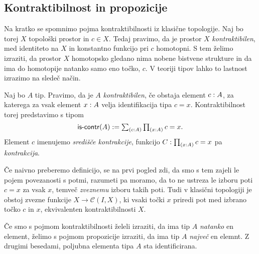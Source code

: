 \subsection{Kontraktibilnost in propozicije}
Na kratko se spomnimo pojma kontraktibilnosti iz klasične topologije. Naj bo torej \(X\) topološki prostor in \(c \in X\). Tedaj pravimo, da je prostor \(X\) \emph{kontraktibilen}, med identiteto na \(X\) in konstantno funkcijo pri \(c\) homotopni. S tem želimo izraziti, da prostor \(X\) homotopsko gledano nima nobene bistvene strukture in da ima do homotopije natanko samo eno točko, \(c\). V teoriji tipov lahko to lastnost izrazimo na sledeč način.
\begin{definicija}
  Naj bo \(A\) tip. Pravimo, da je \(A\) \emph{kontraktibilen}, če obstaja element
  \({c : A}\), za katerega za vsak element \({x : A}\) velja identifikacija tipa \(c = x\). Kontraktibilnost torej predstavimo s tipom
  \[\textnormal{\textsf{is-contr}}(A) := \textstyle \sum_{\left( {c : A} \right)} \textstyle \prod_{\left( {x : A} \right)} c = x.\]
  Element \(c\) imenujemo \emph{središče kontrakcije}, funkcijo
  \({C : \textstyle \prod_{\left( {x : A} \right)} c = x}\) pa \emph{kontrakcija}.
\end{definicija}
Če naivno preberemo definicijo, se na prvi pogled zdi, da smo s tem zajeli le pojem povezanosti s potmi, razumeti pa moramo, da to ne ustreza le izboru poti \(c = x\) za vsak \(x\), temveč \emph{zveznemu} izboru takih poti. Tudi v klasični topologiji je obstoj zvezne funkcije \(X \to \mathcal{C}(I, X)\), ki vsaki točki \(x\) priredi pot med izbrano točko \(c\) in \(x\), ekvivalenten kontraktibilnosti \(X\).

Če smo s pojmom kontraktibilnosti želeli izraziti, da ima tip \(A\) \emph{natanko} en element, želimo s pojmom propozicije izraziti, da ima tip \(A\) \emph{največ} en elemnt. Z drugimi besedami, poljubna elementa tipa \(A\) sta identificirana.

